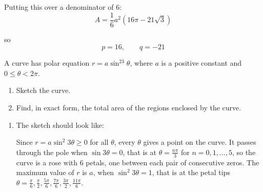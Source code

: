 \documentclass[leqno]{article}
\begin{document}
\begin{enumerate}[
	  label=\textbf{\arabic*.},
	  leftmargin=*,
	  topsep=0pt,
	  partopsep=0pt,
	  parsep=0pt
	]
\begin{djsSolution}
\begin{enumerate}[label=\textbf{(\alph*)}]
	Putting this over a denominator of $6$:
	\[
	A=\frac{1}{6}a^2(16\pi-21\sqrt3)
	\]

	so
	\[
	p=16,\qquad q=-21
	\]
	\end{enumerate}
	\end{djsSolution}
	
	
	\newpage
	
\questionitem

A curve has polar equation $r=a\sin^23\theta$, where $a$ is a positive constant and $0\leq \theta<2\pi$. \\
\begin{enumerate}[label=\textbf{(\alph*)}]
  \item Sketch the curve.  \\
  \item Find, in exact form, the total area of the regions enclosed by the curve.  \\
\end{enumerate}

	\vspace*{10pt}
	
	\begin{djsSolution}
	\begin{enumerate}[label=\textbf{(\alph*)}]
	  \item The sketch should look like:\par\nopagebreak


		Since $r=a\sin^2 3\theta\geq 0$ for all $\theta$, every $\theta$ gives a point on the curve. It passes through the pole when $\sin 3\theta=0$, that is at $\theta=\frac{n\pi}{3}$ for $n=0,1,\dots,5$, so the curve is a rose with 6 petals, one between each pair of consecutive zeros. The maximum value of $r$ is $a$, when $\sin^2 3\theta=1$, that is at the petal tips $\theta=\frac{\pi}{6},\frac{\pi}{2},\frac{5\pi}{6},\frac{7\pi}{6},\frac{3\pi}{2},\frac{11\pi}{6}$.


\end{enumerate}
\end{djsSolution}
\end{enumerate}
\end{document}
